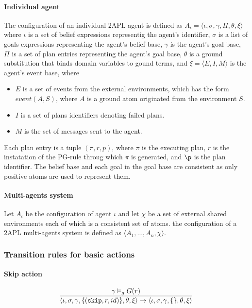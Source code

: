 \documentclass[a4paper]{article}
\begin{document}
\paragraph{Individual agent}

The configuration of an individual 2APL agent is defined as $ A_{\iota} = \langle \iota, \sigma, \gamma, \Pi, \theta, \xi \rangle $ where $\iota$ is a set of belief expressions representig the agent's identifier, $\sigma$ is a list of goals expressions representing the agent's belief base, $\gamma$ is the agent's goal base,  $\Pi$ is a set of plan entries representing the agent's goal base, $\theta$ is a ground substitution that binds domain variables to gound terms, and $\xi = \langle E, I, M \rangle$ is the agent's event base, where

\begin{itemize}
 \item $E$ is a set of events from the external environments, which has the form $event(A,S)$, where $A$ is a ground atom originated from the environment $S$.
 \item $I$ is a set of plans identifiers denoting failed plans.
 \item $M$ is the set of messages sent to the agent.
\end{itemize}

Each plan entry is a tuple $(\pi, r, p)$, where $\pi$ is the executing plan, $r$ is the instatation of the PG-rule throug  which $\pi$ is generated, and $\p$ is the plan identifier. The belief base and each goal in the goal base are consistent as only positive atoms are used to represent them.

\paragraph{Multi-agents system}

Let $A_{\iota}$ be the configuration of agent $\iota$ and let $\chi$ be a set of external shared environments each of which is a consistent set of atoms. the configuration of a 2APL multi-agents system is defined as $ \langle A_{1}, \ldots, A_{n}, \chi \rangle $.


\subsubsection{Transition rules for basic actions}

\paragraph{Skip action}
$$ {{\gamma \vDash_{g} G(r)}\over{\langle \iota, \sigma, \gamma, \{(\texttt{skip}, r, id)\}, \theta, \xi \rangle  \rightarrow \langle \iota, \sigma, \gamma, \{\}, \theta, \xi \rangle}}$$
\end{document}
